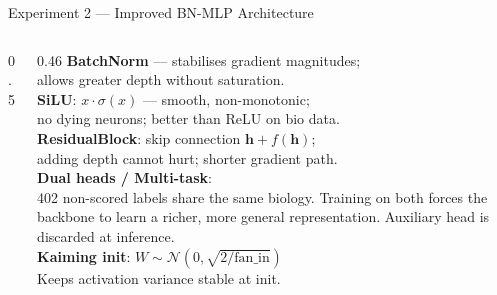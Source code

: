 \documentclass[aspectratio=169, 10pt]{beamer}
\begin{document}
\begin{frame}{Experiment 2 — Improved BN-MLP Architecture}
\begin{columns}[T]
\begin{column}{0.5\textwidth}
    \end{column}
    \begin{column}{0.46\textwidth}
      \textbf{BatchNorm} — stabilises gradient magnitudes;\\
      allows greater depth without saturation.\\[0.4em]
      \textbf{SiLU}: $x \cdot \sigma(x)$ — smooth, non-monotonic;\\
      no dying neurons; better than ReLU on bio data.\\[0.4em]
      \textbf{ResidualBlock}: skip connection $\mathbf{h} + f(\mathbf{h})$;\\
      adding depth cannot hurt; shorter gradient path.\\[0.4em]
      \textbf{Dual heads / Multi-task}:\\
      402 non-scored labels share the same biology.
      Training on both forces the backbone to learn
      a richer, more general representation.
      Auxiliary head is discarded at inference.\\[0.4em]
      \textbf{Kaiming init}: $W \sim \mathcal{N}(0,\sqrt{2/\text{fan\_in}})$\\
      Keeps activation variance stable at init.
    \end{column}
  \end{columns}
\end{frame}
\end{document}
